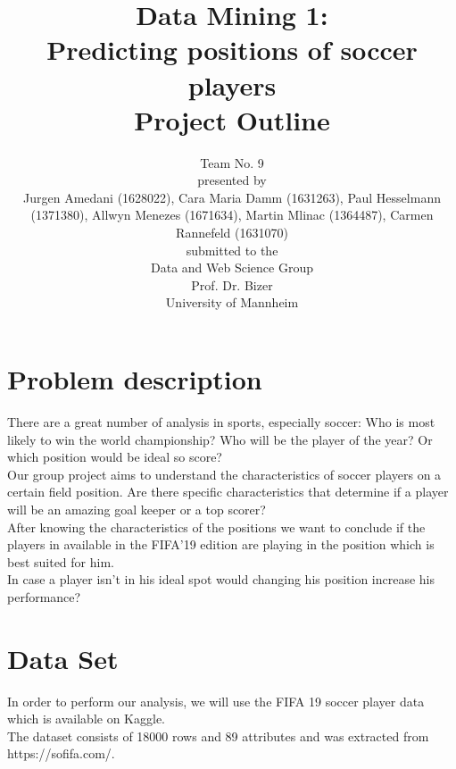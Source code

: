 \documentclass[runningheads]{llncs}
\begin{document}
%
\title{Data Mining 1: \\
Predicting positions of soccer players  \\
Project Outline}


\vspace{2cm}
\author{Team No. 9\\
\vspace{1cm}
presented by\\
Jurgen Amedani (1628022), Cara Maria Damm (1631263), Paul Hesselmann (1371380), Allwyn Menezes (1671634), Martin Mlinac (1364487), Carmen Rannefeld (1631070)\\
\vspace{1cm}
submitted to the \\
Data and Web Science Group\\
Prof. Dr. Bizer\\
University of Mannheim}

\institute{}
\maketitle              %
\section{Problem description}
There are a great number of analysis in sports, especially soccer: Who is most likely to win the world championship? Who will be the player of the year? Or which position would be ideal so score? \\

Our group project aims to understand the characteristics of soccer players on a certain field position. Are there specific characteristics that determine if a player will be an amazing goal keeper or a top scorer?\\
After knowing the characteristics of the positions we want to conclude if the players in available in the FIFA'19 edition are playing in the position which is best suited for him.\\
In case a player isn't in his ideal spot would changing his position increase his performance?


\section{Data Set}
In order to perform our analysis, we will use the FIFA 19 soccer player data which is available on Kaggle.\\
The dataset consists of 18000 rows and 89 attributes and was extracted from https://sofifa.com/.
\end{document}
